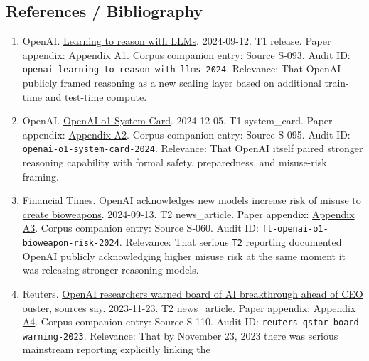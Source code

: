 \documentclass[
  american,
  11pt,
  letterpaper,
]{article}
\providecommand{\tightlist}{%
  \setlength{\itemsep}{0pt}\setlength{\parskip}{0pt}}
\begin{document}
\subsection{References / Bibliography}\label{references-bibliography}

\begin{enumerate}
\def\labelenumi{\arabic{enumi}.}
\tightlist
\item
  OpenAI.
  \href{https://openai.com/index/learning-to-reason-with-llms/}{Learning
  to reason with LLMs}. 2024-09-12. T1 release. Paper appendix:
  \hyperref[appendix-a1-learning-to-reason-with-llms]{Appendix A1}.
  Corpus companion entry: Source S-093. Audit ID:
  \texttt{openai-learning-to-reason-with-llms-2024}. Relevance: That
  OpenAI publicly framed reasoning as a new scaling layer based on
  additional train-time and test-time compute.
\item
  OpenAI. \href{https://openai.com/index/openai-o1-system-card/}{OpenAI
  o1 System Card}. 2024-12-05. T1 system\_card. Paper appendix:
  \hyperref[appendix-a2-openai-o1-system-card]{Appendix A2}. Corpus
  companion entry: Source S-095. Audit ID:
  \texttt{openai-o1-system-card-2024}. Relevance: That OpenAI itself
  paired stronger reasoning capability with formal safety, preparedness,
  and misuse-risk framing.
\item
  Financial Times.
  \href{https://www.ft.com/content/37ba7236-2a64-4807-b1e1-7e21ee7d0914}{OpenAI
  acknowledges new models increase risk of misuse to create bioweapons}.
  2024-09-13. T2 news\_article. Paper appendix:
  \hyperref[appendix-a3-openai-acknowledges-new-models-increase-risk-of-misuse-to-create-bioweapons]{Appendix
  A3}. Corpus companion entry: Source S-060. Audit ID:
  \texttt{ft-openai-o1-bioweapon-risk-2024}. Relevance: That serious
  \texttt{T2} reporting documented OpenAI publicly acknowledging higher
  misuse risk at the same moment it was releasing stronger reasoning
  models.
\item
  Reuters.
  \href{https://www.reuters.com/technology/sam-altmans-ouster-openai-was-precipitated-by-letter-board-about-ai-breakthrough-2023-11-22/}{OpenAI
  researchers warned board of AI breakthrough ahead of CEO ouster,
  sources say}. 2023-11-23. T2 news\_article. Paper appendix:
  \hyperref[appendix-a4-openai-researchers-warned-board-of-ai-breakthrough-ahead-of-ceo-ouster-sources-say]{Appendix
  A4}. Corpus companion entry: Source S-110. Audit ID:
  \texttt{reuters-qstar-board-warning-2023}. Relevance: That by November
  23, 2023 there was serious mainstream reporting explicitly linking the

\end{enumerate}
\end{document}
